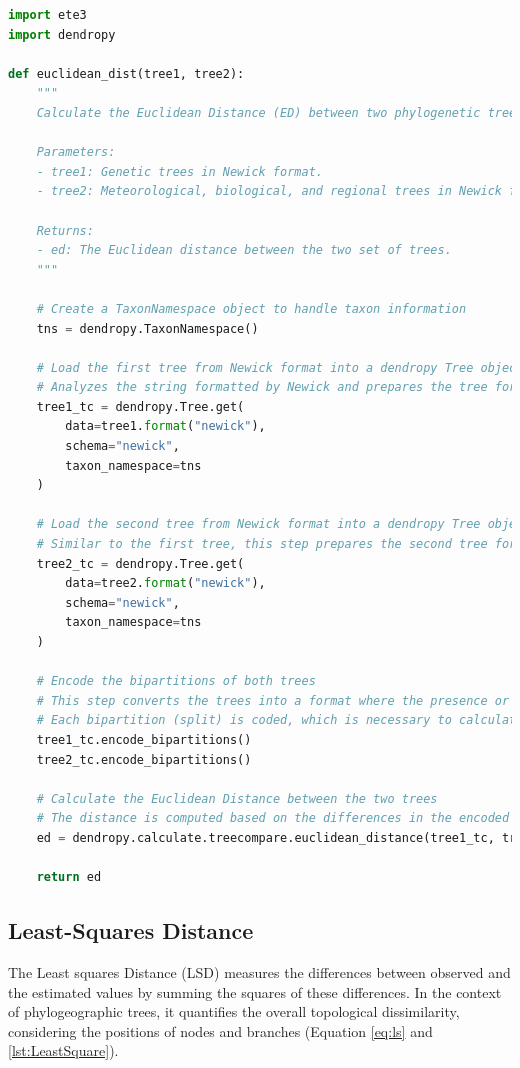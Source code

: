 \begin{lstlisting}[label=lst:euclideanDist,language=Python,caption=Python script for calculating the ED using the ete3 and the dendropy packages in the aPhyloGeo package]
import ete3
import dendropy

def euclidean_dist(tree1, tree2):
    """
    Calculate the Euclidean Distance (ED) between two phylogenetic trees.

    Parameters:
    - tree1: Genetic trees in Newick format.
    - tree2: Meteorological, biological, and regional trees in Newick format.

    Returns:
    - ed: The Euclidean distance between the two set of trees.
    """
    
    # Create a TaxonNamespace object to handle taxon information
    tns = dendropy.TaxonNamespace()

    # Load the first tree from Newick format into a dendropy Tree object
    # Analyzes the string formatted by Newick and prepares the tree for comparison.
    tree1_tc = dendropy.Tree.get(
        data=tree1.format("newick"), 
        schema="newick", 
        taxon_namespace=tns
    )
    
    # Load the second tree from Newick format into a dendropy Tree object
    # Similar to the first tree, this step prepares the second tree for comparison.
    tree2_tc = dendropy.Tree.get(
        data=tree2.format("newick"), 
        schema="newick", 
        taxon_namespace=tns
    )

    # Encode the bipartitions of both trees
    # This step converts the trees into a format where the presence or absence of 
    # Each bipartition (split) is coded, which is necessary to calculate distances.
    tree1_tc.encode_bipartitions()
    tree2_tc.encode_bipartitions()

    # Calculate the Euclidean Distance between the two trees
    # The distance is computed based on the differences in the encoded bipartitions.
    ed = dendropy.calculate.treecompare.euclidean_distance(tree1_tc, tree2_tc)

    return ed
\end{lstlisting}

\subsection{Least-Squares Distance}\label{LS}

The Least squares Distance (LSD) measures the differences between observed and the estimated values by summing the squares of these differences. In the context of phylogeographic trees, it quantifies the overall topological dissimilarity, considering the positions of nodes and branches (Equation \eqref{eq:ls} and \autoref{lst:LeastSquare}).

